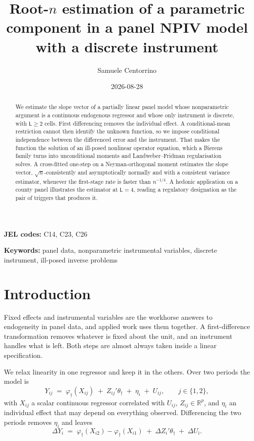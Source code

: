 \documentclass[
  12pt]{article}
\title{Root-\(n\) estimation of a parametric component in a panel NPIV
model with a discrete instrument}
\author{Samuele Centorrino}
\date{2026-08-28}
\newcommand{\1}[1]{\mathds{1}\left[#1\right]}
\theoremstyle{plain}
\theoremstyle{definition}
\theoremstyle{definition}
\theoremstyle{remark}
\newcommand{\IR}{\mathbb{R}}
\newcommand{\vdagger}{\varphi_{\dagger}}
\begin{document}
\maketitle
\begin{abstract}
We estimate the slope vector of a partially linear panel model whose
nonparametric argument is a continuous endogenous regressor and whose
only instrument is discrete, with \(\mathsf L\ge2\) cells. First
differencing removes the individual effect. A conditional-mean
restriction cannot then identify the unknown function, so we impose
conditional independence between the differenced error and the
instrument. That makes the function the solution of an ill-posed
nonlinear operator equation, which a Bierens family turns into
unconditional moments and Landweber--Fridman regularisation solves. A
cross-fitted one-step on a Neyman-orthogonal moment estimates the slope
vector, \(\sqrt n\)-consistently and asymptotically normally and with a
consistent variance estimator, whenever the first-stage rate is faster
than \(n^{-1/4}\). A hedonic application on a county panel illustrates
the estimator at \(\mathsf L=4\), reading a regulatory designation as
the pair of triggers that produces it.
\end{abstract}


\textbf{JEL codes:} C14, C23, C26

\textbf{Keywords:} panel data, nonparametric instrumental variables,
discrete instrument, ill-posed inverse problems

\section{Introduction}\label{introduction}

Fixed effects and instrumental variables are the workhorse answers to
endogeneity in panel data, and applied work uses them together. A
first-difference transformation removes whatever is fixed about the
unit, and an instrument handles what is left. Both steps are almost
always taken inside a linear specification.

We relax linearity in one regressor and keep it in the others. Over two
periods the model is \[
Y_{ij}\;=\;\vdagger(X_{ij})\;+\;Z_{ij}'\theta_\dagger\;+\;\eta_i\;+\;U_{ij},
\qquad j\in\{1,2\},
\] with \(X_{ij}\) a scalar continuous regressor correlated with
\(U_{ij}\), \(Z_{ij}\in\IR^{p}\), and \(\eta_i\) an individual effect
that may depend on everything observed. Differencing the two periods
removes \(\eta_i\) and leaves \[
\Delta Y_i\;=\;\vdagger(X_{i2})-\vdagger(X_{i1})\;+\;\Delta Z_i'\theta_\dagger\;+\;\Delta U_i .
\]
\end{document}
